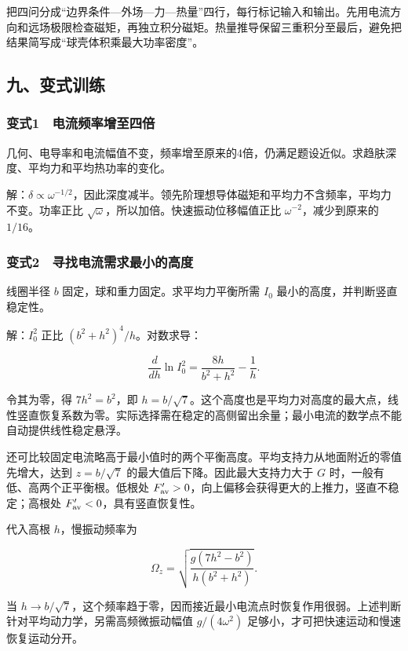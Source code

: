 \documentclass[12pt,a4paper,fontset=fandol]{ctexart}
\begin{document}
把四问分成``边界条件---外场---力---热量''四行，每行标记输入和输出。先用电流方向和远场极限检查磁矩，再独立积分磁矩。热量推导保留三重积分至最后，避免把结果简写成``球壳体积乘最大功率密度''。

\subsection{九、变式训练}\label{ux4e5dux53d8ux5f0fux8badux7ec3-5}

\subsubsection{变式1　电流频率增至四倍}\label{ux53d8ux5f0f1-ux7535ux6d41ux9891ux7387ux589eux81f3ux56dbux500d}

几何、电导率和电流幅值不变，频率增至原来的4倍，仍满足题设近似。求趋肤深度、平均力和平均热功率的变化。

解：\(\delta\propto\omega^{-1/2}\)，因此深度减半。领先阶理想导体磁矩和平均力不含频率，平均力不变。功率正比
\(\sqrt\omega\)，所以加倍。快速振动位移幅值正比
\(\omega^{-2}\)，减少到原来的 \(1/16\)。

\subsubsection{变式2　寻找电流需求最小的高度}\label{ux53d8ux5f0f2-ux5bfbux627eux7535ux6d41ux9700ux6c42ux6700ux5c0fux7684ux9ad8ux5ea6}

线圈半径 \(b\) 固定，球和重力固定。求平均力平衡所需 \(I_0\)
最小的高度，并判断竖直稳定性。

解：\(I_0^2\) 正比 \((b^2+h^2)^4/h\)。对数求导：

\[\frac{d}{dh}\ln I_0^2=
\frac{8h}{b^2+h^2}-\frac1h.\]

令其为零，得 \(7h^2=b^2\)，即
\(h=b/\sqrt7\)。这个高度也是平均力对高度的最大点，线性竖直恢复系数为零。实际选择需在稳定的高侧留出余量；最小电流的数学点不能自动提供线性稳定悬浮。

还可比较固定电流略高于最小值时的两个平衡高度。平均支持力从地面附近的零值先增大，达到
\(z=b/\sqrt7\) 的最大值后下降。因此最大支持力大于 \(G\)
时，一般有低、高两个正平衡根。低根处
\(F'_{\rm av}>0\)，向上偏移会获得更大的上推力，竖直不稳定；高根处
\(F'_{\rm av}<0\)，具有竖直恢复性。

代入高根 \(h\)，慢振动频率为

\[\Omega_z=\sqrt{\frac{g(7h^2-b^2)}{h(b^2+h^2)}}.\]

当
\(h\to b/\sqrt7\)，这个频率趋于零，因而接近最小电流点时恢复作用很弱。上述判断针对平均动力学，另需高频微振动幅值
\(g/(4\omega^2)\) 足够小，才可把快速运动和慢速恢复运动分开。
\end{document}
